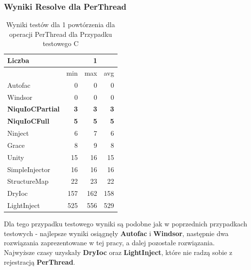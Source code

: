 \documentclass[12pt]{article}
\begin{document}
\subsubsection{Wyniki Resolve dla PerThread}
\begin{table}[H]
\captionsetup{belowskip=0pt,aboveskip=0pt}
\begin{center}
\begin{small}
	\begin{tabular}{ | l | r r r | }
    		\hline
Liczba & & 1 & \\ \hline
 & min & max & avg \\ \hline
Autofac & 0 & 0 & 0 \\ \hline
Windsor & 0 & 0 & 0 \\ \hline
\textbf{NiquIoCPartial} & \textbf{3} & \textbf{3} & \textbf{3} \\ \hline
\textbf{NiquIoCFull} & \textbf{5} & \textbf{5} & \textbf{5} \\ \hline
Ninject & 6 & 7 & 6 \\ \hline
Grace & 8 & 9 & 8 \\ \hline
Unity & 15 & 16 & 15 \\ \hline
SimpleInjector & 16 & 16 & 16 \\ \hline
StructureMap & 22 & 23 & 22 \\ \hline
DryIoc & 157 & 162 & 158 \\ \hline
LightInject & 525 & 556 & 529 \\ \hline
  	\end{tabular}
\end{small}
\end{center}
\caption{Wyniki testów dla 1 powtórzenia dla operacji PerThread dla Przypadku testowego C}
\label{TestCaseC_PerThread1}
\end{table}
Dla tego przypadku testowego wyniki są podobne jak w poprzednich przypadkach testowych - najlepsze wyniki osiągnęły \textbf{Autofac} i \textbf{Windsor}, następnie dwa rozwiązania zaprezentowane w tej pracy, a dalej pozostałe rozwiązania. Najwyższe czasy uzyskały \textbf{DryIoc} oraz \textbf{LightInject}, które nie radzą sobie z rejestracją \textbf{PerThread}.
\\ \\
\end{document}
